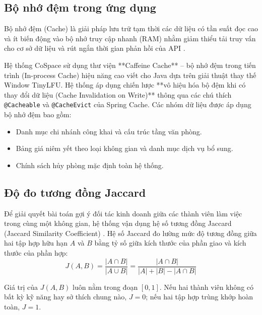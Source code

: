 \subsection{Bộ nhớ đệm trong ứng dụng}
Bộ nhớ đệm (Cache) là giải pháp lưu trữ tạm thời các dữ liệu có tần suất đọc cao và ít biến động vào bộ nhớ truy cập nhanh (RAM) nhằm giảm thiểu tải truy vấn cho cơ sở dữ liệu và rút ngắn thời gian phản hồi của API \cite{kleppmann2017ddia}.

Hệ thống CoSpace sử dụng thư viện **Caffeine Cache** \cite{caffeine_github} -- bộ nhớ đệm trong tiến trình (In-process Cache) hiệu năng cao viết cho Java dựa trên giải thuật thay thế Window TinyLFU. Hệ thống áp dụng chiến lược **vô hiệu hóa bộ đệm khi có thay đổi dữ liệu (Cache Invalidation on Write)** thông qua các chú thích \texttt{@Cacheable} và \texttt{@CacheEvict} của Spring Cache. Các nhóm dữ liệu được áp dụng bộ nhớ đệm bao gồm:
\begin{itemize}
    \item Danh mục chi nhánh công khai và cấu trúc tầng văn phòng.
    \item Bảng giá niêm yết theo loại không gian và danh mục dịch vụ bổ sung.
    \item Chính sách hủy phòng mặc định toàn hệ thống.
\end{itemize}

\subsection{Độ đo tương đồng Jaccard}
Để giải quyết bài toán gợi ý đối tác kinh doanh giữa các thành viên làm việc trong cùng một không gian, hệ thống vận dụng hệ số tương đồng Jaccard (Jaccard Similarity Coefficient) \cite{jaccard1912}. Hệ số Jaccard đo lường mức độ tương đồng giữa hai tập hợp hữu hạn $A$ và $B$ bằng tỷ số giữa kích thước của phần giao và kích thước của phần hợp:
\begin{equation}
    J(A, B) = \frac{|A \cap B|}{|A \cup B|} = \frac{|A \cap B|}{|A| + |B| - |A \cap B|}
    \label{eq:jaccard_formula}
\end{equation}

Giá trị của $J(A, B)$ luôn nằm trong đoạn $[0, 1]$. Nếu hai thành viên không có bất kỳ kỹ năng hay sở thích chung nào, $J = 0$; nếu hai tập hợp trùng khớp hoàn toàn, $J = 1$.

